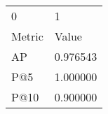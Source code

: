 \begin{tabular}{ll}
0 & 1 \\
Metric & Value \\
AP & 0.976543 \\
P@5 & 1.000000 \\
P@10 & 0.900000 \\
\end{tabular}
